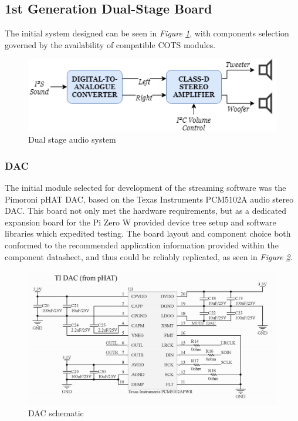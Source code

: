 \documentclass[main.tex]{subfiles}
\begin{document}
\subsection{1st Generation Dual-Stage Board}

The initial system designed can be seen in \textit{Figure \ref{fig:audio-system}}, with components selection governed by the availability of compatible COTS modules. 

\begin{figure}[H]
    \centering
    \includegraphics[scale=0.75]{./figs/audio-system.png}
    \caption{Dual stage audio system}
    \label{fig:audio-system}
\end{figure}

\subsubsection{DAC}
The initial module selected for development of the streaming software was the Pimoroni pHAT DAC, based on the Texas Instruments PCM5102A audio stereo DAC. This board not only met the hardware requirements, but as a dedicated expansion board for the Pi Zero W provided device tree setup and software libraries which expedited testing. The board layout and component choice both conformed to the recommended application information provided within the component datasheet, and thus could be reliably replicated, as seen in \textit{Figure \ref{fig:dac-circuit}}.

\begin{figure}[H]
    \centering
    \includegraphics[scale=0.6]{./figs/DAC-circuit.PNG}
    \caption{DAC schematic}
    \label{fig:dac-circuit}
\end{figure}
\end{document}
